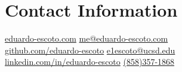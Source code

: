 \section{\sc Contact Information}

\href{https://eduardo-escoto.com/}{eduardo-escoto.com}      \hfill \href{mailto:me@eduardo-escoto.com}{me@eduardo-escoto.com}\\
\href{https://github.com/eduardo-escoto}{github.com/eduardo-escoto}   \hfill \href{mailto:e1escoto@ucsd.edu}{e1escoto@ucsd.edu}\\
\href{https://www.linkedin.com/in/eduardo-escoto/}{linkedin.com/in/eduardo-escoto} \hfill \href{tel:(858)357-1868}{(858)357-1868}


